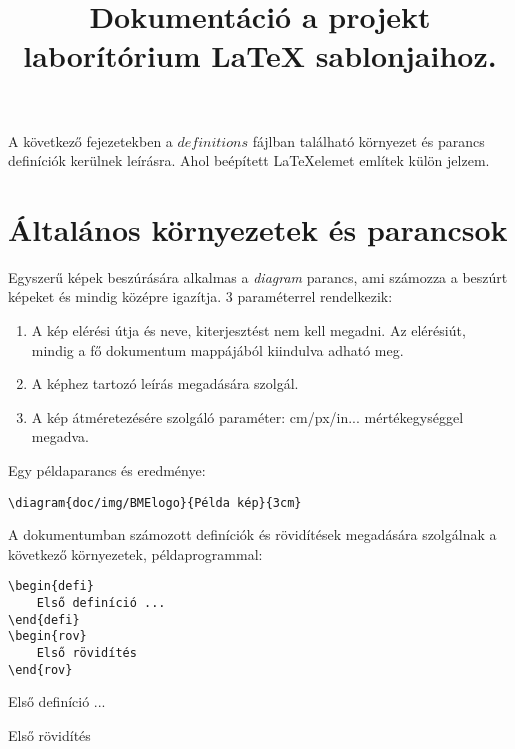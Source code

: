 \documentclass[]{article}
\title{Dokumentáció a projekt laborítórium \LaTeX$ $ sablonjaihoz. }
\begin{document}
\maketitle


\clearpage
A következő fejezetekben a $definitions$ fájlban található környezet és parancs definíciók kerülnek leírásra. Ahol beépített \LaTeX elemet említek külön jelzem.  

\section{Általános környezetek és parancsok}

Egyszerű képek beszúrására alkalmas a \textit{diagram} parancs, ami számozza a beszúrt képeket és mindig középre igazítja. 3 paraméterrel rendelkezik: 
\begin{enumerate}
	\item A kép elérési útja és neve, kiterjesztést nem kell megadni. Az elérésiút, mindig a fő dokumentum mappájából kiindulva adható meg.
	\item A képhez tartozó leírás megadására szolgál.
	\item A kép átméretezésére szolgáló paraméter: cm/px/in... mértékegységgel megadva.
\end{enumerate} 
Egy példaparancs és eredménye:
\begin{lstlisting}
\diagram{doc/img/BMElogo}{Példa kép}{3cm}
\end{lstlisting}

A dokumentumban számozott definíciók és rövidítések megadására szolgálnak a következő környezetek, példaprogrammal:
\begin{lstlisting}
\begin{defi}
    Első definíció ...
\end{defi}
\begin{rov}
    Első rövidítés
\end{rov}
\end{lstlisting}
\begin{defi}
	Első definíció ...
\end{defi}
\begin{rov}
	Első rövidítés
\end{rov}
\end{document}
